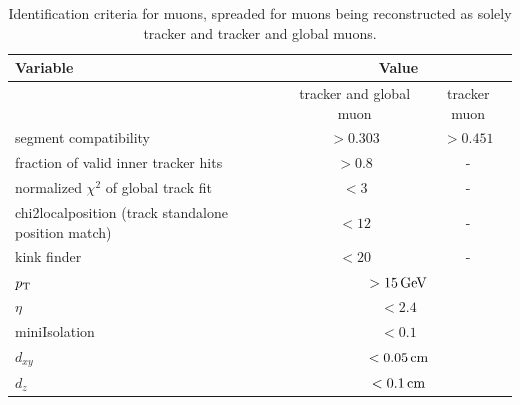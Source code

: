 \begin{table}[h!]
 \centering
 \caption{Identification criteria for muons, spreaded for muons being reconstructed as solely tracker and tracker and global muons.}
 \label{tab:muonID}
 \begin{tabular}{lcc}
  Variable                                            & \multicolumn{2}{c}{Value}                     \\\hline
                                                      & tracker and global muon        & tracker muon \\\hline
  segment compatibility                               & $>0.303$                       & $>0.451$     \\
  fraction of valid inner tracker hits                & $>0.8$                         & -            \\
  normalized $\chi^2$ of global track fit             & $<3$                           & -            \\
  chi2localposition (track standalone position match) & $<12$                          & -            \\
  kink finder                                         & $<20$                          & -            \\\hline
  $p_{\mathrm{T}}$                                               & \multicolumn{2}{c}{$>15\,\text{Ge\hspace{-.08em}V}$}                 \\
  $\eta$                                              & \multicolumn{2}{c}{$<2.4$}                    \\
  miniIsolation                                       & \multicolumn{2}{c}{$<0.1$}                    \\
  $d_{xy}$                                            & \multicolumn{2}{c}{$<0.05\,\text{cm}$}                \\
  $d_z$                                               & \multicolumn{2}{c}{$<0.1\,\text{cm}$}                 \\\hline
 \end{tabular}
\end{table}


